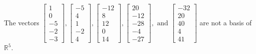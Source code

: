 \begin{exercise}
\begin{exerciseStatement}
  \end{exerciseStatement}
  \begin{exerciseAnswer}
   The vectors \(\left[\begin{array}{r}
1 \\
0 \\
-5 \\
-2 \\
-3
\end{array}\right] , \left[\begin{array}{r}
-5 \\
4 \\
1 \\
-2 \\
4
\end{array}\right] , \left[\begin{array}{r}
-12 \\
8 \\
12 \\
0 \\
14
\end{array}\right] , \left[\begin{array}{r}
20 \\
-12 \\
-28 \\
-4 \\
-27
\end{array}\right] , \text{ and } \left[\begin{array}{r}
-32 \\
20 \\
40 \\
4 \\
41
\end{array}\right]\) 
  	 are not  a basis of \(\mathbb{R}^5\).
  


  \end{exerciseAnswer}
\end{exercise}